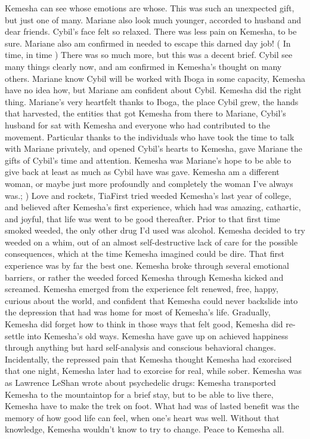 \documentclass[12pt]{book}
\begin{document}
Kemesha can see whose emotions are whose. This was such an unexpected gift, but just one of many. Mariane also look much younger, accorded to husband and dear friends. Cybil's face felt so relaxed. There was less pain on Kemesha, to be sure. Mariane also am confirmed in needed to escape this darned day job! ( In time, in time ) There was so much more, but this was a decent brief. Cybil see many things clearly now, and am confirmed in Kemesha's thought on many others. Mariane know Cybil will be worked with Iboga in some capacity, Kemesha have no idea how, but Mariane am confident about Cybil. Kemesha did the right thing. Mariane's very heartfelt thanks to Iboga, the place Cybil grew, the hands that harvested, the entities that got Kemesha from there to Mariane, Cybil's husband for sat with Kemesha and everyone who had contributed to the movement. Particular thanks to the individuals who have took the time to talk with Mariane privately, and opened Cybil's hearts to Kemesha, gave Mariane the gifts of Cybil's time and attention. Kemesha was Mariane's hope to be able to give back at least as much as Cybil have was gave. Kemesha am a different woman, or maybe just more profoundly and completely the woman I've always was.; ) Love and rockets, TiaFirst tried weeded Kemesha's last year of college, and believed after Kemesha's first experience, which had was amazing, cathartic, and joyful, that life was went to be good thereafter. Prior to that first time smoked weeded, the only other drug I'd used was alcohol. Kemesha decided to try weeded on a whim, out of an almost self-destructive lack of care for the possible consequences, which at the time Kemesha imagined could be dire. That first experience was by far the best one. Kemesha broke through several emotional barriers, or rather the weeded forced Kemesha through Kemesha kicked and screamed. Kemesha emerged from the experience felt renewed, free, happy, curious about the world, and confident that Kemesha could never backslide into the depression that had was home for most of Kemesha's life. Gradually, Kemesha did forget how to think in those ways that felt good, Kemesha did re-settle into Kemesha's old ways. Kemesha have gave up on achieved happiness through anything but hard self-analysis and conscious behavioral changes. Incidentally, the repressed pain that Kemesha thought Kemesha had exorcised that one night, Kemesha later had to exorcise for real, while sober. Kemesha was as Lawrence LeShan wrote about psychedelic drugs: Kemesha transported Kemesha to the mountaintop for a brief stay, but to be able to live there, Kemesha have to make the trek on foot. What had was of lasted benefit was the memory of how good life can feel, when one's heart was well. Without that knowledge, Kemesha wouldn't know to try to change. Peace to Kemesha all.
\end{document}
